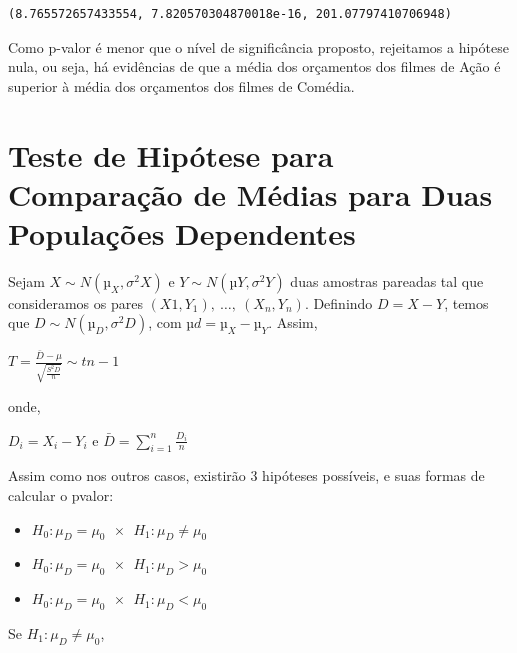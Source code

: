 \documentclass[
  letterpaper,
  DIV=11,
  numbers=noendperiod]{scrreprt}
\begin{document}
\begin{tcolorbox}[enhanced jigsaw, breakable, leftrule=.75mm, left=2mm, opacityback=0, bottomrule=.15mm, toprule=.15mm, rightrule=.15mm, arc=.35mm, colback=white]

\begin{verbatim}
(8.765572657433554, 7.820570304870018e-16, 201.07797410706948)
\end{verbatim}

\end{tcolorbox}

Como p-valor é menor que o nível de significância proposto, rejeitamos a
hipótese nula, ou seja, há evidências de que a média dos orçamentos dos
filmes de Ação é superior à média dos orçamentos dos filmes de Comédia.

\hypertarget{teste-de-hipuxf3tese-para-comparauxe7uxe3o-de-muxe9dias-para-duas-populauxe7uxf5es-dependentes}{%
\section{Teste de Hipótese para Comparação de Médias para Duas
Populações
Dependentes}\label{teste-de-hipuxf3tese-para-comparauxe7uxe3o-de-muxe9dias-para-duas-populauxe7uxf5es-dependentes}}

Sejam \({X \sim N(µ_{X}, σ^2{X})}\) e \({Y \sim N(µ{Y}, σ^2{Y})}\) duas
amostras pareadas tal que consideramos os pares
\({(X{1}, Y_{1}), \ …, \ (X_{n}, Y_{n})}\). Definindo \({D = X - Y}\),
temos que \({D \sim N(µ_{D}, σ^2{D})}\), com \({µ{d} = µ_{X} - µ_{Y}}\).
Assim,

\(T= \frac{\bar{D} - \mu}{\sqrt{\frac{S^2{D}}{n}}} \sim t{n-1}\)

onde,

\(D_{i} = X_{i} - Y_{i}\) e
\(\bar{D} = \sum_{i = 1}^{n} \frac{D_{i}}{n}\)

Assim como nos outros casos, existirão 3 hipóteses possíveis, e suas
formas de calcular o pvalor:

\begin{itemize}
\item
  \(H_{0}: \mu_{D} = \mu_{0} \ \ \times \ \ H_{1}: \mu_{D} \neq \mu_{0}\)
\item
  \(H_{0}: \mu_{D} = \mu_{0} \ \ \times \ \ H_{1}: \mu_{D} > \mu_{0}\)
\item
  \(H_{0}: \mu_{D} = \mu_{0} \ \ \times \ \ H_{1}: \mu_{D} < \mu_{0}\)
\end{itemize}

Se \(H_{1}: \mu_{D} \neq \mu_{0}\),
\end{document}
